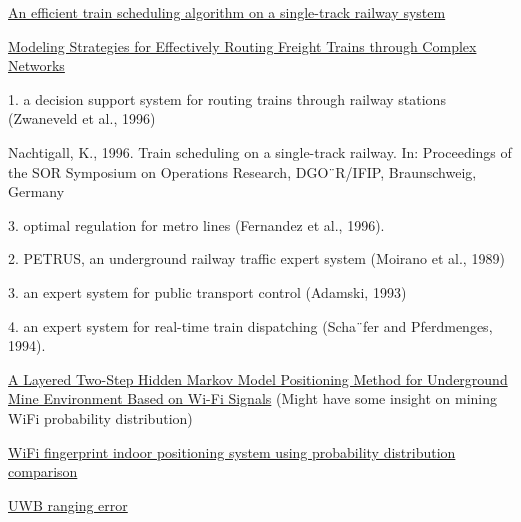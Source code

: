 \documentclass{article}
\begin{document}
\href{https://link.springer.com/content/pdf/10.1007%2Fs10951-018-0558-0.pdf}{An efficient train scheduling algorithm on a single-track railway
system}

\href{http://www-bcf.usc.edu/~maged/publications/trainrouting1.pdf}{Modeling Strategies for Effectively Routing Freight Trains through Complex
Networks}

1. a decision support system for routing trains through
railway stations (Zwaneveld et al., 1996)

Nachtigall, K., 1996. Train scheduling on a single-track railway. In:
Proceedings of the SOR Symposium on Operations Research,
DGO¨R/IFIP, Braunschweig, Germany

3. optimal regulation for metro lines (Fernandez et al.,
1996).

2. PETRUS, an underground railway traffic expert
system (Moirano et al., 1989)

3. an expert system for public transport control
(Adamski, 1993)

4. an expert system for real-time train dispatching
(Scha¨fer and Pferdmenges, 1994).

\href{http://www.diva-portal.org/smash/get/diva2:875106/FULLTEXT01.pdf}{A Layered Two-Step Hidden Markov Model Positioning Method for
Underground Mine Environment Based on Wi-Fi Signals}
(Might have some insight on mining WiFi probability distribution)

\href{https://ieeexplore.ieee.org/document/6288374}{WiFi fingerprint indoor positioning system using probability distribution comparison
}

\href{http://paper.ijcsns.org/07_book/200802/20080224.pdf}{UWB ranging error}
\end{document}
